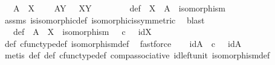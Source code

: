 \begin{isabellebody}
\ \ \ {\isachardoublequoteopen}A\ {\isasymcong}\ X{\isachardoublequoteclose}\ \isanewline
\ \ \ {\isachardoublequoteopen}A\isactrlbsup Y\isactrlesup \ {\isasymcong}\ \ X\isactrlbsup Y\isactrlesup {\isachardoublequoteclose}\isanewline
%
\isadelimproof
%
\endisadelimproof
%
\isatagproof
{}\isamarkupfalse%
\ {\isacharminus}{\kern0pt}\ \isanewline
\ \ \isamarkupfalse%
\ {\isasymphi}\ \ {\isasymphi}{\isacharunderscore}{\kern0pt}def{\isacharcolon}{\kern0pt}\ {\isachardoublequoteopen}{\isasymphi}{\isacharcolon}{\kern0pt}\ X\ {\isasymrightarrow}\ A\ {\isasymand}\ isomorphism{\isacharparenleft}{\kern0pt}{\isasymphi}{\isacharparenright}{\kern0pt}{\isachardoublequoteclose}\isanewline
\ \ \ \ \isamarkupfalse%
\ assms\ is{\isacharunderscore}{\kern0pt}isomorphic{\isacharunderscore}{\kern0pt}def\ isomorphic{\isacharunderscore}{\kern0pt}is{\isacharunderscore}{\kern0pt}symmetric\ \isamarkupfalse%
\ blast\isanewline
\ \ \isamarkupfalse%
\ {\isasympsi}\ \ {\isasympsi}{\isacharunderscore}{\kern0pt}def{\isacharcolon}{\kern0pt}\ {\isachardoublequoteopen}{\isasympsi}{\isacharcolon}{\kern0pt}\ A\ {\isasymrightarrow}\ X\ {\isasymand}\ isomorphism{\isacharparenleft}{\kern0pt}{\isasympsi}{\isacharparenright}{\kern0pt}\ {\isasymand}\ {\isacharparenleft}{\kern0pt}{\isasympsi}\ {\isasymcirc}\isactrlsub c\ {\isasymphi}\ {\isacharequal}{\kern0pt}\ id{\isacharparenleft}{\kern0pt}X{\isacharparenright}{\kern0pt}{\isacharparenright}{\kern0pt}{\isachardoublequoteclose}\isanewline
\ \ \ \ \isamarkupfalse%
\ {\isasymphi}{\isacharunderscore}{\kern0pt}def\ cfunc{\isacharunderscore}{\kern0pt}type{\isacharunderscore}{\kern0pt}def\ isomorphism{\isacharunderscore}{\kern0pt}def\ \isamarkupfalse%
\ fastforce\isanewline
\ \ \isamarkupfalse%
\ idA{\isacharcolon}{\kern0pt}\ {\isachardoublequoteopen}{\isasymphi}\ {\isasymcirc}\isactrlsub c\ {\isasympsi}\ {\isacharequal}{\kern0pt}\ id{\isacharparenleft}{\kern0pt}A{\isacharparenright}{\kern0pt}{\isachardoublequoteclose}\isanewline
\ \ \ \ \isamarkupfalse%
\ {\isacharparenleft}{\kern0pt}metis\ {\isasymphi}{\isacharunderscore}{\kern0pt}def\ {\isasympsi}{\isacharunderscore}{\kern0pt}def\ cfunc{\isacharunderscore}{\kern0pt}type{\isacharunderscore}{\kern0pt}def\ comp{\isacharunderscore}{\kern0pt}associative\ id{\isacharunderscore}{\kern0pt}left{\isacharunderscore}{\kern0pt}unit{}\ isomorphism{\isacharunderscore}{\kern0pt}def{\isacharparenright}{\kern0pt}\isanewline

\end{isabellebody}
